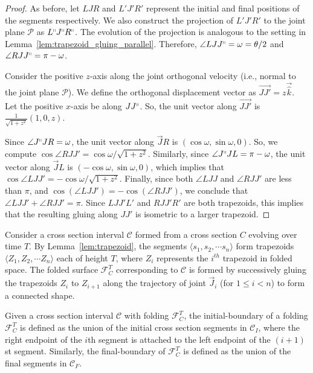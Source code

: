 \begin{proof}
As before, let $LJR$ and $L'J'R'$ represent the initial and final positions of the segments respectively.
We also construct the projection of $L'J'R'$ to the joint plane $\mathcal P$ as $L^\shortparallel J^\shortparallel R^\shortparallel$.
The evolution of the projection is analogous to the setting in Lemma~\ref{lem:trapezoid_gluing_parallel}.
Therefore, $\angle LJJ^\shortparallel = \omega = \theta/2$ and $\angle RJJ^\shortparallel = \pi-\omega$.

Consider the positive $z$-axis along the joint orthogonal velocity (i.e., normal to the joint plane $\mathcal P$).
We define the orthogonal displacement vector as $\overrightarrow{JJ'} = z\vec{\hat k}$.
Let the positive $x$-axis be along $JJ^\shortparallel$. So, the unit vector along $\overrightarrow{JJ'}$ is $\frac{1}{\sqrt{1+z^2}}(1,0,z)$.

Since $\angle J^\shortparallel JR = \omega$, the unit vector along $\overrightarrow JR$ is $(\cos\omega,\sin\omega,0)$.
So, we compute $\cos \angle RJJ' = \cos\omega/\sqrt{1+z^2}$.
Similarly, since $\angle J^\shortparallel JL = \pi-\omega$, the unit vector along $\overrightarrow JL$ is $(-\cos\omega,\sin\omega,0)$,
which implies that $\cos \angle LJJ' = -\cos\omega/\sqrt{1+z^2}$.
Finally, since both $\angle LJJ$ and $\angle RJJ'$ are less than $\pi$, and $\cos\left(\angle LJJ' \right) = -\cos\left(\angle RJJ' \right)$,
we conclude that $\angle LJJ' + \angle RJJ' = \pi$.
Since $LJJ'L'$ and $RJJ'R'$ are both trapezoids, this implies that the resulting gluing along $JJ'$ is isometric to a larger trapezoid.
\end{proof}

\begin{definition}
\label{def:interval_folding}
Consider a cross section interval $\mathcal C$ formed from a cross section $C$ evolving over time $T$.
By Lemma~\ref{lem:trapezoid}, the segments $ \langle s_1, s_2,\cdots s_n \rangle$ form trapezoids
$ \langle Z_1, Z_2,\cdots Z_n \rangle$ each of height $T$, where $Z_i$ represents the $i^{th}$ trapezoid in folded space.
The folded surface $\mathcal F_C^T$ corresponding to $\mathcal C$ is formed by successively gluing the trapezoids
$Z_i$ to $Z_{i+1}$ along the trajectory of joint $\vec J_i$ (for $1\le i<n$) to form a connected shape.
\end{definition}

\begin{definition}
\label{def:interval_folding_boundary}
Given a cross section interval $\mathcal C$ with folding $\mathcal F_C^T$,
the initial-boundary of a folding $\mathcal F_C^T$ is defined as the union of the initial cross section segments in $\mathcal C_I$,
where the right endpoint of the $i$th segment is attached to the left endpoint of the $(i+1)$st segment.
Similarly, the final-boundary of $\mathcal F_C^T$ is defined as the union of the final segments in $\mathcal C_F$.
\end{definition}

